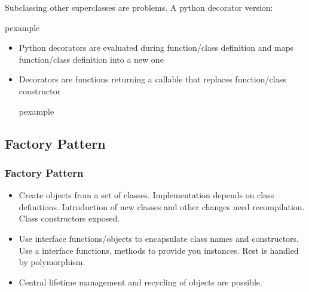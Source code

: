 \documentclass[trans,compress,xcolor=table]{beamer}
\begin{document}
\begin{frame}
Subclassing other superclasses are problems. A python decorator
version:
\begin{beamercolorbox}{pexample}
\codesingb
\end{beamercolorbox}
\end{frame}

\begin{frame}
\begin{itemize}
\item Python decorators are evaluated during function/class definition
	and maps function/class definition into a new one
\item Decorators are functions returning a callable that replaces
	function/class constructor
\begin{beamercolorbox}{pexample}
\codepydec
\end{beamercolorbox}
\end{itemize}
\end{frame}

\subsection{Factory Pattern}
\begin{frame}
\frametitle{Factory Pattern}
\begin{itemize}
\item {} Create objects from a set of classes. Implementation
	depends on class definitions. Introduction of new classes and 
	other changes need recompilation. Class constructors exposed.
\item {} Use interface functions/objects to encapsulate
	class names and constructors.
	Use a interface functions, methods to provide you instances. Rest is
	handled by polymorphism.
\item Central lifetime management and recycling of objects are possible.
\end{itemize}
\end{frame}
\end{document}
